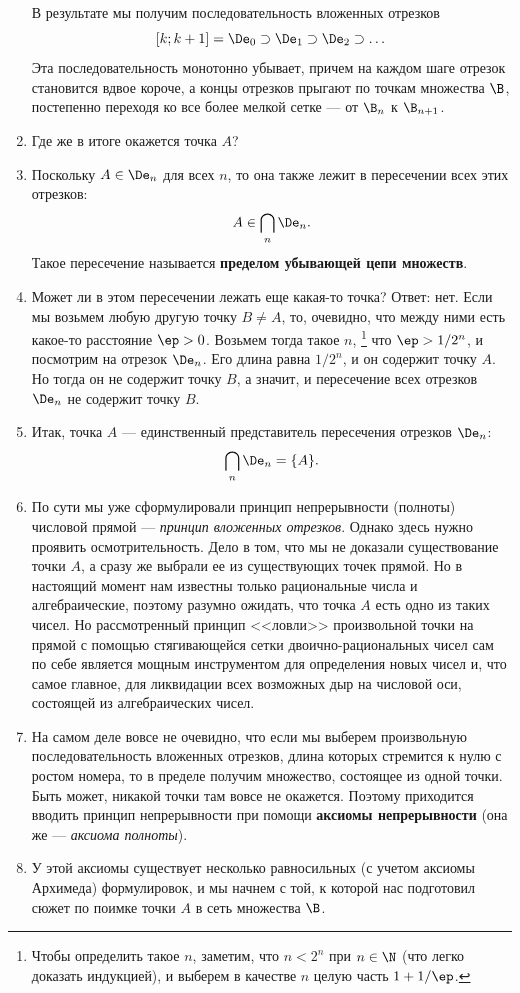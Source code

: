 \begin{enumerate}
В результате мы получим последовательность вложенных отрезков
$$
[k;k+1]=\De_0\supset\De_1\supset\De_2\supset\dots
$$
Эта последовательность монотонно убывает, причем на каждом шаге отрезок становится вдвое короче, а концы отрезков прыгают по точкам множества $\B$, постепенно переходя ко все более мелкой сетке --- от $\B_n$ к $\B_{n+1}$.

\item Где же в итоге окажется точка $A$?
\item Поскольку $A\in\De_n$ для всех $n$, то она также лежит в пересечении всех этих отрезков:
$$
A\in\bigcap_n\De_n.
$$
Такое пересечение называется \textbf{пределом убывающей цепи множеств}.
\item Может ли в этом пересечении лежать еще какая-то точка? Ответ: нет. Если мы возьмем любую другую точку $B\ne A$, то, очевидно, что между ними есть какое-то расстояние $\ep>0$. Возьмем тогда такое $n$,
\footnote{Чтобы определить такое $n$, заметим, что $n<2^n$ при $n\in\N$ (что легко доказать индукцией), и выберем в качестве $n$ целую часть $1+1/\ep$.}
 что $\ep>1/2^n$, и посмотрим на отрезок $\De_n$. Его длина равна $1/2^n$, и он содержит точку $A$. Но тогда он не содержит точку $B$, а значит, и пересечение всех отрезков $\De_n$ не содержит точку $B$.
\item Итак, точка $A$ --- единственный представитель пересечения отрезков $\De_n$:
$$
\bigcap_n\De_n = \{A\}.
$$
\item По сути мы уже сформулировали принцип непрерывности (полноты) числовой прямой --- \textit{принцип вложенных отрезков}. Однако здесь нужно проявить осмотрительность. Дело в том, что мы не доказали существование точки $A$, а сразу же выбрали ее из существующих точек прямой. Но в настоящий момент нам известны только рациональные числа и алгебраические, поэтому разумно ожидать, что точка $A$ есть одно из таких чисел. Но рассмотренный принцип <<ловли>> произвольной точки на прямой с помощью стягивающейся сетки двоично-рациональных чисел сам по себе является мощным инструментом для определения новых чисел и, что самое главное, для ликвидации всех возможных дыр на числовой оси, состоящей из алгебраических чисел.





\item На самом деле вовсе не очевидно, что если мы выберем произвольную последовательность вложенных отрезков, длина которых стремится к нулю с ростом номера, то в пределе получим множество, состоящее из одной точки. Быть может, никакой точки там вовсе не окажется. Поэтому приходится вводить принцип непрерывности при помощи \textbf{аксиомы непрерывности} (она же --- \textit{аксиома полноты}).
\item У этой аксиомы существует несколько равносильных (с учетом аксиомы Архимеда) формулировок, и мы начнем с той, к которой нас подготовил сюжет по поимке точки $A$ в сеть множества $\B$.


\end{enumerate}
